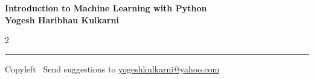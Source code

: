 \documentclass[8pt,landscape]{article}
\begin{document}
\footnotesize


\begin{center}
\Large{\textbf{Introduction to Machine Learning with Python\\ Yogesh Haribhau Kulkarni}}  
\end{center}

\begin{multicols}{2}

\end{multicols}

\rule{\linewidth}{0.25pt}
\scriptsize
Copyleft \textcopyleft\  Send suggestions to 
\href{http://www.yogeshkulkarni.com}{yogeshkulkarni@yahoo.com}
\end{document}
